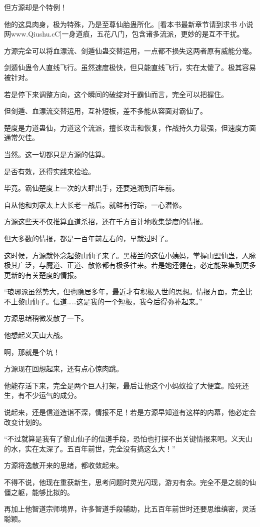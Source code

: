 \begin{this_body}
但方源却是个特例！

他的这具肉身，极为特殊，乃是至尊仙胎蛊所化。[看本书最新章节请到求书 小说网www.Qiushu.cC]一身道痕，五花八门，包含诸多流派，更妙的是互不干扰。

方源完全可以将血漂流、剑遁仙蛊交替运用，一点都不损失这两者原有威能分毫。

剑遁仙蛊令人直线飞行。虽然速度极快，但只能直线飞行，实在太傻了。极其容易被针对。

若是停下来调整方向，这个瞬间的破绽对于霸仙而言，完全可以把握住。

但剑遁、血漂流交替运用，互补短板，差不多能从容面对霸仙了。

楚度是力道蛊仙，力道这个流派，擅长攻击和恢复，作战持久力最强，但速度方面通常欠佳。

当然。这一切都只是方源的估算。

是否有效，还得实践来检验。

毕竟。霸仙楚度上一次的大肆出手，还要追溯到百年前。

自从他和刘家太上大长老一战后。就鲜有行踪，一心潜修。

方源这些天不仅推算血道杀招，还在千方百计地收集楚度的情报。

但大多数的情报，都是一百年前左右的，早就过时了。

这时候，方源就怀念起黎山仙子来了。黑楼兰的这位小姨妈，掌握山盟仙蛊，人脉极其广泛，与魔道、正道、散修都有极多往来。若是她还健在，必定能采集到更多更新的有关楚度的情报。

“琅琊派虽然势大，但也隐居多年，最近才有积极入世的思想。情报方面，完全比不上黎山仙子。信道……这是我的一个短板，我今后得弥补起来。”

方源思绪稍微发散了一下。

他想起义天山大战。

啊，那就是个坑！

方源现在回想起来，还有点心惊肉跳。

他能存活下来，完全是两个巨人打架，最后让他这个小蚂蚁捡了大便宜。险死还生，有不少运气的成分。

说起来，还是信道造诣不深，情报不足！若是方源早知道有这样的内幕，他必定会改变计划的。

“不过就算是我有了黎山仙子的信道手段，恐怕也打探不出关键情报来吧。义天山的水，实在太深了。五百年前世，完全没有搞这么大！”

方源将逸散开来的思绪，都收敛起来。

不得不说，他现在重获新生，思考问题时灵光闪现，游刃有余。完全不是之前的仙僵之躯，能够比拟的。

再加上他智道宗师境界，许多智道手段辅助，比五百年前世时还要思维缜密，灵活聪颖。


\end{this_body}
